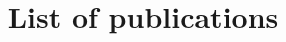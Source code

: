 \documentclass[a4paper,12pt]{article}
\title{\textbf{List of publications}}
\date{}
\begin{document}
	\maketitle
	\nocite{*}
	\printbibliography
\end{document}
